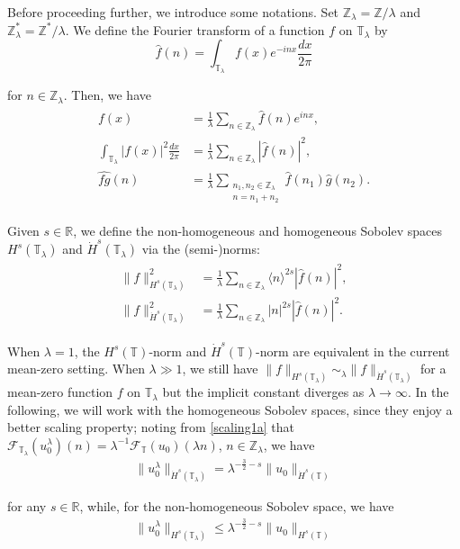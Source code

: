 \documentclass[letterpaper, 11pt,  reqno]{amsart}
\newcommand{\1}{\hspace{0.5mm}\text{I}\hspace{0.5mm}}
\newcommand{\noi}{\noindent}
\newcommand{\Z}{\mathbb{Z}}
\newcommand{\R}{\mathbb{R}}
\newcommand{\T}{\mathbb{T}}
\newcommand{\F}{\mathcal{F}}
\newcommand{\ld}{\lambda}
\newcommand{\ft}{\widehat}
\newcommand{\jb}[1]
{\langle #1 \rangle}
\numberwithin{equation}{section}
\numberwithin{theorem}{section}
\begin{document}
Before proceeding further, we 
introduce some notations.
Set
 $\Z_{\ld} = \Z/\ld$
and 
$\Z^*_{\ld} = \Z^*/\ld$. 
We define 
 the Fourier transform of a function $f$ on $\T_\ld$
by 
$$
\ft  f(n)=\int_{\T_\ld}f(x)e^{-i n x} \frac{d x}{2\pi}
$$


\noi
for $n\in\Z_{\ld}$.
Then, we have 
\begin{align}
\begin{split}
f(x)
& =
\frac{1}{\ld} \sum_{ n \in\Z_{\ld}}\ft  f(n)e^{i  nx}, \\
\int_{\T_\ld}|f(x)|^2 \frac{d x}{2\pi}
& =\frac{1}{\ld}\sum_{n\in\Z_{\ld}}|\ft  f(n)|^2,\\
\ft{fg}(n)
& =\frac{1}{\ld}
 \sum_{ \substack{n_1, n_2 \in \Z_\ld\\n = n_1+n_2}}
 \ft  f(n_1)\ft  g(n_2).
\end{split}
\label{FT3}
\end{align}


\noi
Given $s \in \R$, 
we define the non-homogeneous and homogeneous Sobolev spaces $H^{s}(\T_\ld)$ 
and $\dot H^{s}(\T_\ld)$ 
via the (semi-)norms: 
\begin{align}
\begin{split}
\|  f  \|^2_{H^{s}(\T_\ld)}
& =\frac{1}{\ld}
\sum_{n \in \Z_{\ld}}
\jb{n}^{2s} | \ft f(n) |^2, \\
\|  f  \|^2_{\dot H^{s}(\T_\ld)}
& =\frac{1}{\ld}
\sum_{n \in \Z_{\ld}}
|n|^{2s} | \ft f(n) |^2.
\end{split}
\label{FT4}
\end{align}

\noi
When $\ld = 1$, 
the $H^s(\T)$-norm and $\dot H^s(\T)$-norm
are equivalent in the current mean-zero setting.
When $\ld \gg1$, 
we still have 
$\|f \|_{H^s(\T_\ld)}\sim_\ld \|f\|_{\dot H^s(\T_\ld)}$
for a mean-zero function $f$ on $\T_\ld$
but the implicit constant diverges as $\ld \to \infty$.
In the following, 
we will  work with the homogeneous Sobolev spaces, 
since they enjoy a better scaling property; 
 noting from \eqref{scaling1a} that 
$\F_{\T_\ld}(u_0^\ld)(n) = \ld^{-1} \F_\T(u_0)(\ld n)$, $n \in \Z_\ld$, 
we have
\begin{align}
\|u_0^\ld\|_{\dot H^s(\T_\ld)}
=  \ld^{-\frac 32 - s} \|u_0\|_{\dot H^s(\T)}
\label{scaling3}
\end{align}

\noi
for any $s \in \R$, 
while, for the non-homogeneous Sobolev space,  we have 
\begin{align*}
\|u_0^\ld\|_{ H^s(\T_\ld)}
\le  \ld^{-\frac 32 - s} \|u_0\|_{ H^s(\T)}
\end{align*}
\end{document}
